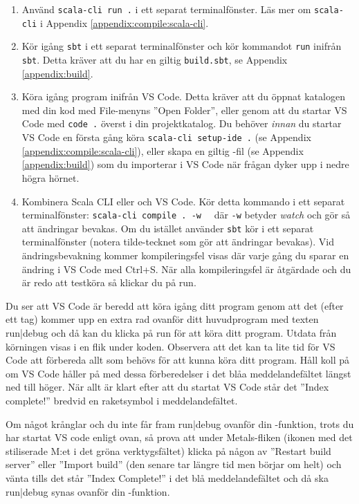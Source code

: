 \begin{enumerate}
  \item Använd \texttt{scala-cli run .} i ett separat terminalfönster. Läs mer om \texttt{scala-cli} i Appendix \ref{appendix:compile:scala-cli}.
  \item Kör igång \texttt{sbt} i ett separat terminalfönster och kör kommandot \texttt{run} inifrån \texttt{sbt}. Detta kräver att du har en giltig \texttt{build.sbt}, se Appendix \ref{appendix:build}.
  \item Köra igång program inifrån VS Code. Detta kräver att du öppnat katalogen med din kod med File-menyns ''Open Folder'', eller genom att du startar VS Code med \texttt{code .} överst i din projektkatalog. Du behöver \textit{innan} du startar VS Code en första gång köra \texttt{scala-cli setup-ide .} (se Appendix \ref{appendix:compile:scala-cli}), eller skapa en giltig -fil (se Appendix \ref{appendix:build}) som du importerar i VS Code när frågan dyker upp i nedre högra hörnet.
  \item Kombinera Scala CLI eller  och VS Code. Kör detta kommando i ett separat terminalfönster: \texttt{scala-cli compile . -w}~~ där \texttt{-w} betyder \emph{watch} och gör så att ändringar bevakas. Om du istället använder \texttt{sbt} kör  i ett separat terminalfönster (notera tilde-tecknet som gör att ändringar bevakas). Vid ändringsbevakning kommer kompileringsfel visas där varje gång du sparar en ändring i VS Code med Ctrl+S. När alla kompileringsfel är åtgärdade och du är redo att testköra så klickar du på \textsf{run}.
\end{enumerate}

Du ser att VS Code är beredd att köra igång ditt program genom att det (efter ett tag) kommer upp en extra rad ovanför ditt huvudprogram med texten \textsf{run|debug} och då kan du klicka på \textsf{run} för att köra ditt program. Utdata från körningen visas i en flik under koden. Observera att det kan ta lite tid för VS Code att förbereda allt som behövs för att kunna köra ditt program. Håll koll på om VS Code håller på med dessa förberedelser i det blåa meddelandefältet längst ned till höger. När allt är klart efter att du startat VS Code står det ''Index complete!'' bredvid en raketsymbol i meddelandefältet.

Om något krånglar och du inte får fram \textsf{run|debug} ovanför din -funktion, trots du har startat VS code enligt ovan, så prova att under Metals-fliken (ikonen med det stiliserade M:et i det gröna verktygsfältet) klicka på någon av ''Restart build server'' eller ''Import build'' (den senare tar längre tid men börjar om helt) och vänta tills det står ''Index Complete!'' i det blå meddelandefältet och då ska \textsf{run|debug} synas ovanför din -funktion.


